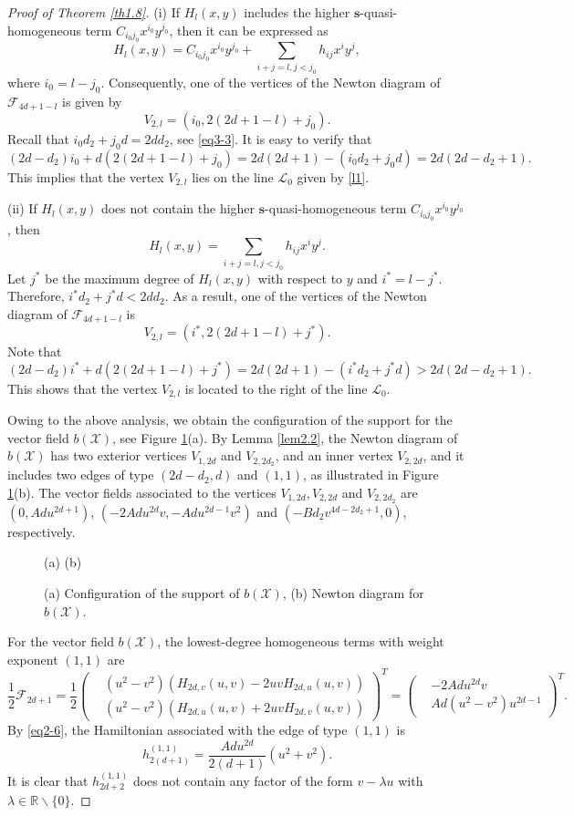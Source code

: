 \documentclass[10pt,a4paper]{amsart}
\numberwithin{equation}{section}
\begin{document}
\begin{proof}[Proof of Theorem \ref{th1.8}]
(i) If $H_{l}(x,y)$ includes the higher $\mathbf{s}$-quasi-homogeneous term 
$C_{i_{0}j_{0}}x^{i_0}y^{j_0}$,  then it can be expressed as
$$
H_{l}(x,y)= C_{i_{0}j_{0}}x^{i_0}y^{j_0}+\sum_{i+j=l, j<j_0}h_{ij}x^iy^j,
$$
where $i_0=l-j_0$. Consequently, one of the vertices of the Newton diagram of 
$\mathcal{F}_{4d+1-l}$ is given by
\[
V_{2,l}=(i_0, 2(2d+1-l)+j_0).
\]
Recall that $i_0d_2+j_0d=2d d_2$, see \eqref{eq3-3}. It is easy to verify that
\[ %
(2d-d_2)i_0+d(2(2d+1-l)+j_0)=2d(2d+1)-(i_0d_2+j_0d)=2d(2d-d_2+1).
\]
This implies that the vertex $V_{2,l}$ lies on the line $\mathcal{L}_0$ given by 
\eqref{l1}.

(ii) If $H_{l}(x,y)$ does not contain the higher $\mathbf{s}$-quasi-homogeneous term 
$C_{i_{0}j_{0}}x^{i_0}y^{j_0}$, then
$$
H_{l}(x,y)= \sum_{i+j=l, j<j_0}h_{ij}x^iy^j.
$$
Let $j^*$ be the maximum degree of $H_l(x,y)$ with respect to $y$ and $i^*=l-j^*$. 
Therefore, $i^*d_2+j^*d<2d d_2$. As a result, one of the vertices of the Newton 
diagram of $\mathcal{F}_{4d+1-l}$ is
\[
V_{2,l}=(i^*, 2(2d+1-l)+j^*).
\]
Note that
\[
(2d-d_2)i^*+d(2(2d+1-l)+j^*)=2d(2d+1)-(i^*d_2+j^*d)>2d(2d-d_2+1).
\]
This shows that the vertex $V_{2,l}$ is located to the right of the line $\mathcal{L}_0$.

Owing to the above analysis, we obtain the configuration of the support for the vector 
field $b(\mathcal{X})$, see Figure \ref{Fig.main}(a).  By Lemma \ref{lem2.2}, 
the Newton diagram of $b(\mathcal{X})$ has two exterior vertices $V_{1,2d}$ and 
$V_{2,2d_2}$, and an inner vertex $V_{2,2d}$, and  it  includes two edges of type 
$(2 d-d_2, d)$ and $(1,1)$, as illustrated in Figure \ref{Fig.main}(b). 
The vector fields associated to the vertices $V_{1,2 d}, V_{2,2 d}$ and $V_{2,2 d_2}$ 
are $(0, Adu^{2d+1})$, $(-2Ad u^{2 d}v, -Ad u^{2 d-1}v^{2})$ and
$(-Bd_2 v^{4 d-2 d_2+1},0)$, respectively.

\begin{figure}[htp]
\centering
(a) \hfil (b)
\caption{ (a) Configuration of the support of $b(\mathcal{X})$,
(b)  Newton diagram for $b(\mathcal{X})$.}
\label{Fig.main}
\end{figure}

For the vector field $b(\mathcal{X})$, the lowest-degree homogeneous terms with weight 
exponent $(1,1)$ are
\[
\frac{1}{2}\mathcal{F}_{2d+1}
=\frac{1}{2}\begin{pmatrix}
& (u^{2}-v^{2})(H_{2d,v}(u,v)-2uvH_{2d,u}(u,v)) \\
& (u^{2}-v^{2})(H_{2d,u}(u,v)+2uvH_{2d,v}(u,v))
\end{pmatrix}^T
= \begin{pmatrix}
& -2Adu^{2d}v \\
& Ad(u^2-v^2)u^{2d-1}
\end{pmatrix}^T.
\]
By \eqref{eq2-6}, the Hamiltonian associated with the edge of type $(1,1)$ is
\[
h_{2(d+1)}^{(1,1)}=\frac{Adu^{2d}}{2(d+1)}(u^2+v^2).
\]
It is clear that $h_{2d+2}^{(1,1)}$ does not contain any factor of the form 
$v-\lambda u$ with $\lambda \in \mathbb{R}\backslash\{0\}$.


\end{proof}
\end{document}

